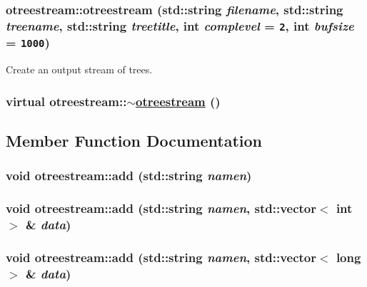 \hypertarget{classotreestream_a1}{
\subsubsection[otreestream]{\setlength{\rightskip}{0pt plus 5cm}otreestream::otreestream (std::string {\em filename}, std::string {\em treename}, std::string {\em treetitle}, int {\em complevel} = {\tt 2}, int {\em bufsize} = {\tt 1000})}}
\label{classotreestream_a1}


Create an output stream of trees. 

\hypertarget{classotreestream_a2}{
\subsubsection[$\sim$otreestream]{\setlength{\rightskip}{0pt plus 5cm}virtual otreestream::$\sim$\hyperlink{classotreestream}{otreestream} ()}}
\label{classotreestream_a2}




\subsection{Member Function Documentation}
\hypertarget{classotreestream_a13}{
\subsubsection[add]{\setlength{\rightskip}{0pt plus 5cm}void otreestream::add (std::string {\em namen})}}
\label{classotreestream_a13}


\hypertarget{classotreestream_a12}{
\subsubsection[add]{\setlength{\rightskip}{0pt plus 5cm}void otreestream::add (std::string {\em namen}, std::vector$<$ int $>$ \& {\em data})}}
\label{classotreestream_a12}


\hypertarget{classotreestream_a11}{
\subsubsection[add]{\setlength{\rightskip}{0pt plus 5cm}void otreestream::add (std::string {\em namen}, std::vector$<$ long $>$ \& {\em data})}}
\label{classotreestream_a11}



